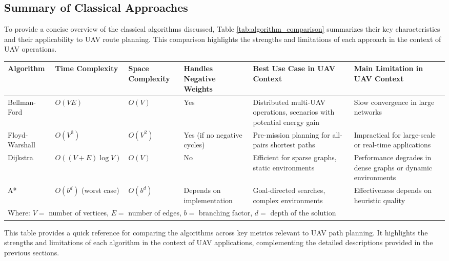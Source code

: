 \documentclass[conference]{IEEEtran}
\begin{document}
\subsection{Summary of Classical Approaches}

To provide a concise overview of the classical algorithms discussed, Table \ref{tab:algorithm_comparison} summarizes their key characteristics and their applicability to UAV route planning. This comparison highlights the strengths and limitations of each approach in the context of UAV operations.

\begin{table*}[ht]
\centering
\caption{Comparison of Classical Path Planning Algorithms for UAV Applications}
\label{tab:algorithm_comparison}
\renewcommand{\arraystretch}{1.3}
\begin{tabular}{|p{2cm}|p{2.5cm}|p{2.5cm}|p{2.5cm}|p{3.5cm}|p{3.5cm}|}
\hline
\textbf{Algorithm} & \textbf{Time Complexity} & \textbf{Space Complexity} & \textbf{Handles Negative Weights} & \textbf{Best Use Case in UAV Context} & \textbf{Main Limitation in UAV Context} \\
\hline
Bellman-Ford & $O(VE)$ & $O(V)$ & Yes & Distributed multi-UAV operations, scenarios with potential energy gain & Slow convergence in large networks \\
\hline
Floyd-Warshall & $O(V^3)$ & $O(V^2)$ & Yes (if no negative cycles) & Pre-mission planning for all-pairs shortest paths & Impractical for large-scale or real-time applications \\
\hline
Dijkstra & $O((V+E)\log V)$ & $O(V)$ & No & Efficient for sparse graphs, static environments & Performance degrades in dense graphs or dynamic environments \\
\hline
A* & $O(b^d)$ (worst case) & $O(b^d)$ & Depends on implementation & Goal-directed searches, complex environments & Effectiveness depends on heuristic quality \\
\hline
\multicolumn{6}{l}{\small Where: $V =$ number of vertices, $E =$ number of edges, $b =$ branching factor, $d =$ depth of the solution}\\
\end{tabular}
\end{table*}

This table provides a quick reference for comparing the algorithms across key metrics relevant to UAV path planning. It highlights the strengths and limitations of each algorithm in the context of UAV applications, complementing the detailed descriptions provided in the previous sections.
\end{document}
